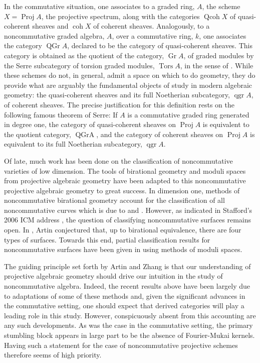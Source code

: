 \documentclass[12pt]{amsart}
\theoremstyle{definition}
\begin{document}
In the commutative situation, one associates to a graded ring, $A$, the scheme $X = \operatorname{Proj} A$, the projective spectrum, along with the categories $\operatorname{Qcoh} X$ of quasi-coherent sheaves and $\operatorname{coh} X$ of coherent sheaves.
Analogously, to a noncommutative graded algebra, $A$, over a commutative ring, $k$, one associates the category $\operatorname{QGr} A$, declared to be the category of quasi-coherent sheaves.
This category is obtained as the quotient of the category, $\operatorname{Gr} A$, of graded modules by the Serre subcategory of torsion graded modules, $\operatorname{Tors} A$, in the sense of \cite{DCA}.
While these schemes do not, in general, admit a space on which to do geometry, they do provide what are arguably the fundamental objects of study in modern algebraic geometry: the quasi-coherent sheaves and its full Noetherian subcategory, $\operatorname{qgr} A$, of coherent sheaves.
The  precise justification for this definition rests on the following famous theorem of Serre: If $A$ is a commutative graded ring generated in degree one, the category of quasi-coherent sheaves on $\operatorname{Proj} A$ is equivalent to the quotient category, $\operatorname{QGr A}$, and the category of coherent sheaves on $\operatorname{Proj} A$ is equivalent to its full Noetherian subcategory, $\operatorname{qgr} A$.

Of late, much work has been done on the classification of noncommutative varieties of low dimension.
The tools of birational geometry and moduli spaces from projective algebraic geometry have been adapted to this noncommutative projective algebraic geometry to great success.
In dimension one, methods of noncommutative birational geometry account for the classification of all noncommutative curves which is due to \cite{AS95} and \cite{Reiten-VdB}.
However, as indicated in Stafford's 2006 ICM address \cite{Stafford02}, the question of classifying noncommutative surfaces remains open.
In \cite{ArtinConj}, Artin conjectured that, up to birational equivalence, there are four types of surfaces.
Towards this end, partial classification results for noncommutative surfaces have been given in \cite{ATV,Stephenson96,Stephenson97} using methods of moduli spaces.

The guiding principle set forth by Artin and Zhang is that our understanding of projective algebraic geometry should drive our intuition in the study of noncommutative algebra.
Indeed, the recent results above have been largely due to adaptations of some of these methods and, given the significant advances in the commutative setting, one should expect that derived categories will play a leading role in this study.
However, conspicuously absent from this accounting are any such developments.
As was the case in the commutative setting, the primary stumbling block appears in large part to be the absence of Fourier-Mukai kernels.
Having such a statement for the case of noncommutative projective schemes therefore seems of high priority.
\end{document}
